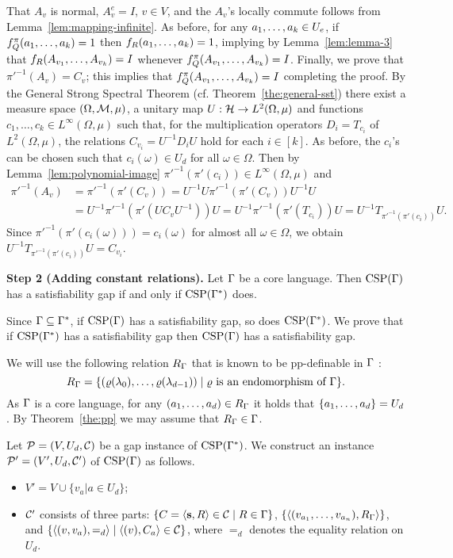 \documentclass[11pt,letter]{article}
\begin{document}
That $A_v$ is normal, $A_v^e=I$, $v\in V$, and the $A_v$'s locally commute follows from Lemma~\ref{lem:mapping-infinite}. As before, for any $a _1,\ldots, a _{k}\in U_e$, if $f^\pi_Q(a _1,\ldots, a _{k})=1$ then $f_R(a _1,\ldots, a _{k})=1$, implying by Lemma~\ref{lem:lemma-3} that $f_R(A_{v_1},\ldots, A_{v_k})=I$ whenever $f^\pi_Q(A_{v_1},\ldots, A_{v_k})=I$. Finally, we prove that $\pi'^{-1}(A_v)=C_v$; this implies that $f^\pi_Q(A_{v_1},\ldots, A_{v_k})=I$ completing the proof. By the General Strong Spectral Theorem (cf. Theorem~\ref{the:general-sst}) there exist a measure space $(\Omega,{\mathcal M},\mu)$, a unitary map $U:{\mathcal H}\to L^2(\Omega,\mu)$ and functions $c_1,\dots,c_k\in L^\infty(\Omega,\mu)$ such that, for the multiplication operators $D_i = T_{c_i}$ of $L^2(\Omega,\mu)$, the relations $C_{v_i} = U^{-1} D_iU$ hold for each $i\in [k]$. As before, the $c_i$'s can be chosen such that $c_i(\omega)\in U_d$ for all $\omega\in\Omega$. Then by Lemma~\ref{lem:polynomial-image} $\pi'^{-1}(\pi'(c_i))\in L^\infty(\Omega,\mu)$ and 
\begin{align*}
\pi'^{-1}(A_v) &= \pi'^{-1}(\pi'(C_v))=U^{-1}U\pi'^{-1}(\pi'(C_v))U^{-1}U\\
&=U^{-1}\pi'^{-1}(\pi'(UC_vU^{-1}))U=U^{-1}\pi'^{-1}(\pi'(T_{c_i}))U=U^{-1}T_{\pi'^{-1}(\pi'(c_i))}U.
\end{align*}
Since $\pi'^{-1}(\pi'(c_i(\omega)))=c_i(\omega)$ for almost all $\omega\in\Omega$, we obtain $U^{-1}T_{\pi'^{-1}(\pi'(c_i))}U=C_{v_i}$.


\medskip

{\bf Step 2  (Adding constant relations).}
Let $\Gamma$ be a core language. Then ${\rm CSP}(\Gamma)$ has a satisfiability gap if and only if ${\rm CSP}(\Gamma^*)$ does.

\smallskip

Since $\Gamma\subseteq\Gamma^*$, if ${\rm CSP}(\Gamma)$ has a satisfiability gap, so does
${\rm CSP}(\Gamma^*)$. We prove that if ${\rm CSP}(\Gamma^*)$ has a satisfiability gap then
${\rm CSP}(\Gamma)$ has a satisfiability gap.

We will use the following relation $R_\Gamma$ that is known to be pp-definable in $\Gamma$ \cite{Jeavons99:expressive}: 
\[
R_\Gamma=\{(\varrho(\lambda_0),\ldots,\varrho(\lambda_{d-1}))\mid \text{$\varrho$ is an endomorphism of $\Gamma$}\}.
\]
As $\Gamma$ is a core language, for any $(a _1,\ldots, a _{d})\in R_\Gamma$ it holds that $\{a _1,\ldots, a _{d}\}=U_d$. By Theorem~\ref{the:pp} we may assume that $R_\Gamma\in\Gamma$.

Let ${\mathcal P}=(V,U_d,{\mathcal C})$ be a gap instance of ${\rm CSP}(\Gamma^*)$. We construct an instance ${\mathcal P}'=(V',U_d,{\mathcal C}')$ of ${\rm CSP}(\Gamma)$ as follows. 
\begin{itemize}
    \item 
    $V'= V \cup \{v_a | a \in U_d \}$;
    \item
    ${\mathcal C}'$ consists of three parts: $\{C=\langle {\bf s},R \rangle\in{\mathcal C}\mid R\in\Gamma\}$, $\{\langle (v_{a_1},\ldots, v_{a_n}),R_\Gamma \rangle\}$, and  $\{\langle (v,v_a),=_d \rangle\mid \langle (v),C_a \rangle\in{\mathcal C}\}$, where $=_d$ denotes the equality relation on $U_d$.
\end{itemize}
\end{document}
